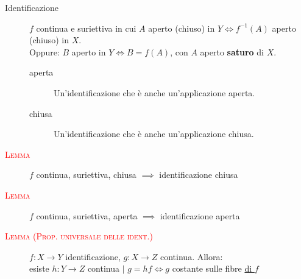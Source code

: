 \documentclass[a4paper,10pt]{article}
\newcommand{\myth}{\normalfont \scshape \textcolor{red}}
\theoremstyle{remark}
\theoremstyle{definition}
\begin{document}
\begin{description}
    \item[Identificazione]  $f$ continua e suriettiva in cui $A$ aperto (chiuso) in $Y \iff f^{-1}(A)$ aperto (chiuso) in $X$.
    \\Oppure: $B$ aperto in $Y \iff B = f(A)$, con $A$ aperto \textbf{saturo} di $X$.
     \begin{description}
        \item[aperta] Un'identificazione che è anche un'applicazione aperta.
        \item[chiusa] Un'identificazione che è anche un'applicazione chiusa.
    \end{description}
    \item[\myth{Lemma}] $f$ continua, suriettiva, chiusa $\implies$ identificazione chiusa 
    \item[\myth{Lemma}] $f$ continua, suriettiva, aperta $\implies$ identificazione aperta 
    \item[\myth{Lemma (Prop. universale delle ident.)}] $f: X \to Y$ identificazione, $g: X \to Z$ continua. Allora: \\
    esiste $h: Y \to Z$ continua $\mid$ $g=hf \iff g$ costante sulle fibre \underline{di $f$}
\end{description}
\end{document}
